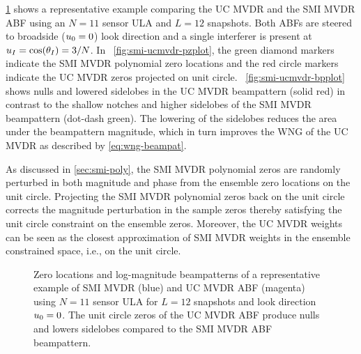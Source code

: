 
\figurename{} \ref{fig:smi-ucmvdr-plots} shows a representative
example comparing the UC MVDR and the
SMI MVDR ABF using an $N = 11$ sensor ULA and $L = 12$ snapshots. Both
ABFs are steered to broadside ($u_0 = 0$) look direction and a
single interferer is present at $u_I = \cos(\theta_I) = 3/N$. In
\figurename{}~\ref{fig:smi-ucmvdr-pzplot}, the green diamond markers
indicate the SMI MVDR polynomial zero locations and the red circle
markers indicate the UC MVDR zeros projected on unit
circle. \figurename{}~\ref{fig:smi-ucmvdr-bpplot} shows nulls and
lowered sidelobes in the UC MVDR beampattern (solid red) in contrast
to the shallow notches and higher sidelobes of the SMI MVDR
beampattern (dot-dash green). The lowering of the sidelobes reduces
the area under the beampattern magnitude, which in turn improves the
WNG of the UC MVDR as described by \eqref{eq:wng-beampat}.

As discussed in \sect{}\ref{sec:smi-poly}, the SMI MVDR polynomial
zeros are randomly perturbed in both magnitude and phase from the
ensemble zero locations on the unit circle. Projecting the SMI MVDR
polynomial zeros back on the unit circle corrects the magnitude
perturbation in the sample zeros thereby satisfying the
unit circle constraint on the ensemble zeros. Moreover, the UC MVDR
weights can be seen as the closest approximation of SMI MVDR weights
in the ensemble constrained space, i.e., on the unit circle.

\begin{figure}[!hp]
\centering
{}

\caption[Zero locations and log-magnitude beampatterns of a
representative example of the SMI MVDR and the UC MVDR ABF.] {Zero locations
  and log-magnitude beampatterns of a representative example of SMI
  MVDR (blue) and UC MVDR ABF (magenta) using $N = 11$ sensor ULA for
  $L = 12$ snapshots and look direction $u_0 = 0$. The unit circle
  zeros of the UC MVDR ABF produce nulls and lowers sidelobes compared
  to the SMI MVDR ABF beampattern.}
\label{fig:smi-ucmvdr-plots}
\end{figure}

